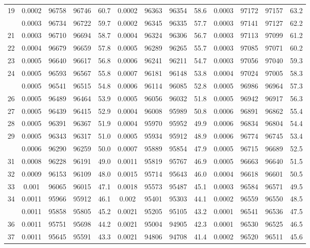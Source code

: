 \documentclass[
  14pt,
]{article}
\begin{document}
\begin{longtable}[t]{lcccccccccccc}
19 & 0.0002 & 96758 & 96746 & 60.7 & 0.0002 & 96363 & 96354 & 58.6 & 0.0003 & 97172 & 97157 & 63.2\\
\addlinespace
20 & 0.0003 & 96734 & 96722 & 59.7 & 0.0002 & 96345 & 96335 & 57.7 & 0.0003 & 97141 & 97127 & 62.2\\
21 & 0.0003 & 96710 & 96694 & 58.7 & 0.0004 & 96324 & 96306 & 56.7 & 0.0003 & 97113 & 97099 & 61.2\\
22 & 0.0004 & 96679 & 96659 & 57.8 & 0.0005 & 96289 & 96265 & 55.7 & 0.0003 & 97085 & 97071 & 60.2\\
23 & 0.0005 & 96640 & 96617 & 56.8 & 0.0006 & 96241 & 96211 & 54.7 & 0.0003 & 97056 & 97040 & 59.3\\
24 & 0.0005 & 96593 & 96567 & 55.8 & 0.0007 & 96181 & 96148 & 53.8 & 0.0004 & 97024 & 97005 & 58.3\\
\addlinespace
25 & 0.0005 & 96541 & 96515 & 54.8 & 0.0006 & 96114 & 96085 & 52.8 & 0.0005 & 96986 & 96964 & 57.3\\
26 & 0.0005 & 96489 & 96464 & 53.9 & 0.0005 & 96056 & 96032 & 51.8 & 0.0005 & 96942 & 96917 & 56.3\\
27 & 0.0005 & 96439 & 96415 & 52.9 & 0.0004 & 96008 & 95989 & 50.8 & 0.0006 & 96891 & 96862 & 55.4\\
28 & 0.0005 & 96391 & 96367 & 51.9 & 0.0004 & 95970 & 95952 & 49.9 & 0.0006 & 96834 & 96804 & 54.4\\
29 & 0.0005 & 96343 & 96317 & 51.0 & 0.0005 & 95934 & 95912 & 48.9 & 0.0006 & 96774 & 96745 & 53.4\\
\addlinespace
30 & 0.0006 & 96290 & 96259 & 50.0 & 0.0007 & 95889 & 95854 & 47.9 & 0.0005 & 96715 & 96689 & 52.5\\
31 & 0.0008 & 96228 & 96191 & 49.0 & 0.0011 & 95819 & 95767 & 46.9 & 0.0005 & 96663 & 96640 & 51.5\\
32 & 0.0009 & 96153 & 96109 & 48.0 & 0.0015 & 95714 & 95643 & 46.0 & 0.0004 & 96618 & 96601 & 50.5\\
33 & 0.001 & 96065 & 96015 & 47.1 & 0.0018 & 95573 & 95487 & 45.1 & 0.0003 & 96584 & 96571 & 49.5\\
34 & 0.0011 & 95966 & 95912 & 46.1 & 0.002 & 95401 & 95303 & 44.1 & 0.0002 & 96559 & 96550 & 48.5\\
\addlinespace
35 & 0.0011 & 95858 & 95805 & 45.2 & 0.0021 & 95205 & 95105 & 43.2 & 0.0001 & 96541 & 96536 & 47.5\\
36 & 0.0011 & 95751 & 95698 & 44.2 & 0.0021 & 95004 & 94905 & 42.3 & 0.0001 & 96530 & 96525 & 46.5\\
37 & 0.0011 & 95645 & 95591 & 43.3 & 0.0021 & 94806 & 94708 & 41.4 & 0.0002 & 96520 & 96511 & 45.6\\

\end{longtable}
\end{document}
